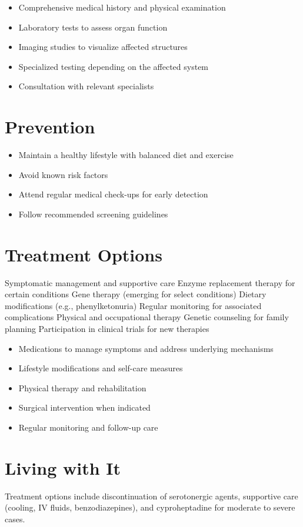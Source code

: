\begin{itemize}[noitemsep]
  \item Comprehensive medical history and physical examination
  \item Laboratory tests to assess organ function
  \item Imaging studies to visualize affected structures
  \item Specialized testing depending on the affected system
  \item Consultation with relevant specialists
\end{itemize}
\section{Prevention}
\begin{itemize}[noitemsep]
  \item Maintain a healthy lifestyle with balanced diet and exercise
  \item Avoid known risk factors
  \item Attend regular medical check-ups for early detection
  \item Follow recommended screening guidelines
\end{itemize}
\section{Treatment Options}
Symptomatic management and supportive care Enzyme replacement therapy for certain conditions Gene therapy (emerging for select conditions) Dietary modifications (e.g., phenylketonuria) Regular monitoring for associated complications Physical and occupational therapy Genetic counseling for family planning Participation in clinical trials for new therapies

\begin{itemize}[noitemsep]
  \item Medications to manage symptoms and address underlying mechanisms
  \item Lifestyle modifications and self-care measures
  \item Physical therapy and rehabilitation
  \item Surgical intervention when indicated
  \item Regular monitoring and follow-up care
\end{itemize}
\section{Living with It}
Treatment options include discontinuation of serotonergic agents, supportive care (cooling, IV fluids, benzodiazepines), and cyproheptadine for moderate to severe cases.

